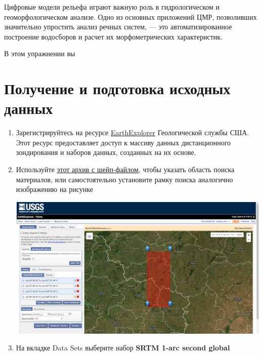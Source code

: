 \documentclass[
  12pt,
]{book}
\begin{document}
Цифровые модели рельефа играют важную роль в гидрологическом и геоморфологическом анализе. Одно из основных приложений ЦМР, позволивших значительно упростить анализ речных систем, --- это автоматизированное построение водосборов и расчет их морфометрических характеристик.

В этом упражнении вы

\hypertarget{hydrodem-init}{%
\section{Получение и подготовка исходных данных}\label{hydrodem-init}}

\begin{enumerate}
\def\labelenumi{\arabic{enumi}.}
\item
  Зарегистрируйтесь на ресурсе \href{https://earthexplorer.usgs.gov/}{EarthExplorer} Геологической службы США. Этот ресурс предоставляет доступ к массиву данных дистанционного зондирования и наборов данных, созданных на их основе.
\item
  Используйте \href{https://1drv.ms/u/s!AmtmZDq3JgxHgZY2yqR_DOlBpv0ZDw?e=U0dvNG}{этот архив с шейп-файлом}, чтобы указать область поиска материалов, или самостоятельно установите рамку поиска аналогично изображению на рисунке

  \includegraphics{images/Ex13/earthexplorer1.png}
\item
  На вкладке Data Sets выберите набор \textbf{SRTM 1-arc second global}


\end{enumerate}
\end{document}
